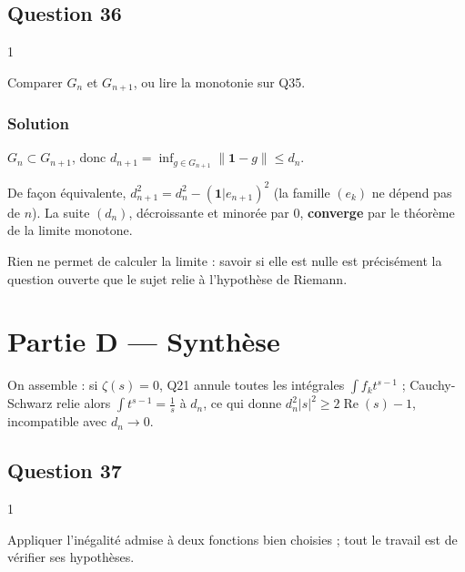 \documentclass[11pt,a4paper]{article}
\begin{document}
\hypertarget{question-36}{%
\subsection{Question 36}\label{question-36}}

\begin{indication}{1}

Comparer \(G_n\) et \(G_{n+1}\), ou lire la monotonie sur Q35.

\end{indication}

\hypertarget{solution-35}{%
\subsubsection{Solution}\label{solution-35}}

\(G_n\subset G_{n+1}\), donc \(d_{n+1}=\inf_{g\in G_{n+1}}\|\mathbf 1-g\|\leqslant d_n\).

De façon équivalente, \(d_{n+1}^2=d_n^2-(\mathbf 1|e_{n+1})^2\) (la famille \((e_k)\) ne dépend pas de \(n\)). La suite \((d_n)\), décroissante et minorée par \(0\), \textbf{converge} par le théorème de la limite monotone.

\begin{piege}

Rien ne permet de calculer la limite : savoir si elle est nulle est précisément la question ouverte que le sujet relie à l'hypothèse de Riemann.

\end{piege}

\hypertarget{partie-d-synthuxe8se}{%
\section{Partie D --- Synthèse}\label{partie-d-synthuxe8se}}

On assemble : si \(\zeta(s)=0\), Q21 annule toutes les intégrales \(\int f_kt^{s-1}\) ; Cauchy-Schwarz relie alors \(\int t^{s-1}=\frac1s\) à \(d_n\), ce qui donne \(d_n^2|s|^2\geqslant2\operatorname{Re}(s)-1\), incompatible avec \(d_n\to0\).

\hypertarget{question-37}{%
\subsection{Question 37}\label{question-37}}

\begin{indication}{1}

Appliquer l'inégalité admise à deux fonctions bien choisies ; tout le travail est de vérifier ses hypothèses.

\end{indication}
\end{document}
